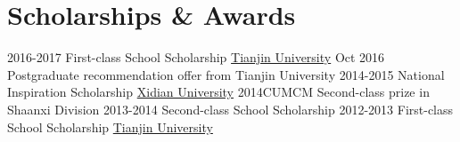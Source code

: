 \documentclass[letterpaper]{twentysecondcv} %
\begin{document}
\section{Scholarships \& Awards}

\begin{twenty}
    
    \twentyitem
        {2016-2017}
        {First-class School Scholarship}
        {\href{http://tju.edu.cn/}{Tianjin University}}
        {}
        {}
    \twentyitem
        {Oct 2016}
        {Postgraduate recommendation offer from Tianjin University}
        {}
        {}
        {}
    \twentyitem
        {2014-2015}
        {National Inspiration Scholarship}
        {\href{http://www.xidian.edu.cn/}{Xidian University}}
        {}
        {}
    \twentyitem
        {2014CUMCM}
        {Second-class prize in Shaanxi Division}
        {}
        {}
        {}
    \twentyitem
        {2013-2014}  
        {Second-class School Scholarship}
        {}
        {}
        {}
    \twentyitem        
        {2012-2013}
        {First-class School Scholarship}
        {\href{http://tju.edu.cn/}{Tianjin University}}
        {}
        {}        
\end{twenty}
\end{document}
